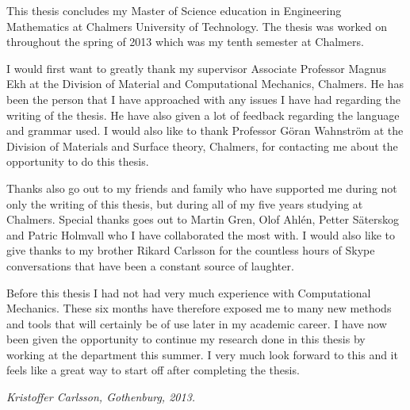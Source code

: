 \documentclass[preface.tex]{subfiles}
\begin{document}
This thesis concludes my Master of Science education in Engineering Mathematics at Chalmers University of Technology. The thesis was worked on throughout the spring of 2013 which was my tenth semester at Chalmers.

I would first want to greatly thank my supervisor Associate Professor Magnus Ekh at the Division of Material and Computational Mechanics, Chalmers. He has been the person that I have approached with any issues I have had regarding the writing of the thesis.  He have also given a lot of feedback regarding the language and grammar used. I would also like to thank Professor Göran Wahnström at the Division of Materials and Surface theory, Chalmers, for contacting me about the opportunity to do this thesis. 

Thanks also go out to my friends and family who have supported me during not only the writing of this thesis, but during all of my five years studying at Chalmers. Special thanks goes out to Martin Gren, Olof Ahlén, Petter Säterskog and Patric Holmvall who I have collaborated the most with. I would also like to give thanks to my brother Rikard Carlsson for the countless hours of Skype conversations that have been a constant source of laughter.

Before this thesis I had not had very much experience with Computational Mechanics. These six months have therefore exposed me to many new methods and tools that will certainly be of use later in my academic career. I have now been given the opportunity to continue my research done in this thesis by working at the department this summer. I very much look forward to this and it feels like a great way to start off after completing the thesis.

\textit{Kristoffer Carlsson, Gothenburg, 2013.}
\end{document}
